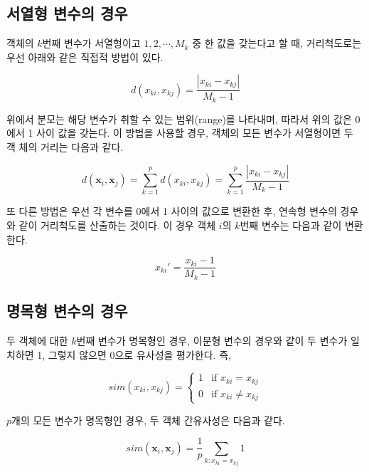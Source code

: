 \documentclass[]{book}
\begin{document}
\hypertarget{ordinal-similarity-metric}{%
\subsection{서열형 변수의 경우}\label{ordinal-similarity-metric}}

객체의 \(k\)번째 변수가 서열형이고 \(1, 2, \cdots, M_k\) 중 한 값을 갖는다고 할 때, 거리척도로는 우선 아래와 같은 직접적 방법이 있다.

\begin{equation*}
d(x_{ki}, x_{kj}) = \frac{|x_{ki} - x_{kj}|}{M_k - 1}
\end{equation*}

위에서 분모는 해당 변수가 취할 수 있는 범위(range)를 나타내며, 따라서 위의 값은 0에서 1 사이 값을 갖는다. 이 방법을 사용할 경우, 객체의 모든 변수가 서열형이면 두 객 체의 거리는 다음과 같다.

\begin{equation*}
d(\mathbf{x}_i, \mathbf{x}_j) = \sum_{k = 1}^{p} d(x_{ki}, x_{kj}) = \sum_{k = 1}^{p} \frac{|x_{ki} - x_{kj}|}{M_k - 1}
\end{equation*}

또 다른 방법은 우선 각 변수를 0에서 1 사이의 값으로 변환한 후, 연속형 변수의 경우와 같이 거리척도를 산출하는 것이다. 이 경우 객체 \(i\)의 \(k\)번째 변수는 다음과 같이 변환한다.

\begin{equation*}
x_{ki}' = \frac{x_{ki} - 1}{M_k - 1}
\end{equation*}

\hypertarget{nominal-similarity-metric}{%
\subsection{명목형 변수의 경우}\label{nominal-similarity-metric}}

두 객체에 대한 \(k\)번째 변수가 명목형인 경우, 이분형 변수의 경우와 같이 두 변수가 일치하면 1, 그렇지 않으면 0으로 유사성을 평가한다. 즉,

\begin{equation*}
sim(x_{ki}, x_{kj}) = \begin{cases}
1 & \text{if } x_{ki} = x_{kj}\\
0 & \text{if } x_{ki} \neq x_{kj}
\end{cases}
\end{equation*}

\(p\)개의 모든 변수가 명목형인 경우, 두 객체 간유사성은 다음과 같다.

\begin{equation*}
sim(\mathbf{x}_i, \mathbf{x}_j) = \frac{1}{p} \sum_{k: x_{ki} = x_{kj}} 1
\end{equation*}
\end{document}
